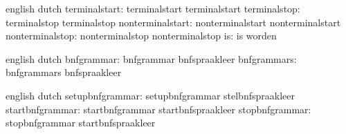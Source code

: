 

\unprotect




\startconstants     english             dutch
     terminalstart: terminalstart       terminalstart
      terminalstop: terminalstop        terminalstop
  nonterminalstart: nonterminalstart    nonterminalstart
   nonterminalstop: nonterminalstop     nonterminalstop
                is: is                  worden
\stopconstants


\startvariables     english             dutch
        bnfgrammar: bnfgrammar          bnfspraakleer
       bnfgrammars: bnfgrammars         bnfspraakleer
\stopvariables


\startcommands      english             dutch
   setupbnfgrammar: setupbnfgrammar     stelbnfspraakleer
   startbnfgrammar: startbnfgrammar     startbnfspraakleer
    stopbnfgrammar: stopbnfgrammar      startbnfspraakleer
\stopcommands


